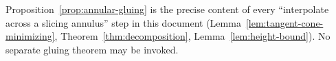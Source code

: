 \begin{fnote}\label{fnote:no-gluing-theorem}
Proposition~\ref{prop:annular-gluing} is the precise content of every
``interpolate across a slicing annulus'' step in this document
(Lemma~\ref{lem:tangent-cone-minimizing}, Theorem~\ref{thm:decomposition},
Lemma~\ref{lem:height-bound}).  No separate gluing theorem may be invoked.
\end{fnote}

